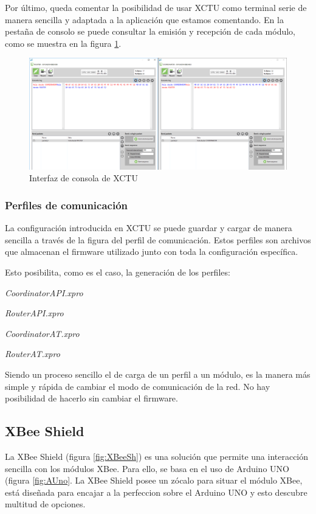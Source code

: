 Por último, queda comentar la posibilidad de usar XCTU como terminal serie de manera sencilla y adaptada a la aplicación que estamos comentando. En la pestaña de consolo se puede consultar la emisión y recepción de cada módulo, como se muestra en la figura \ref{fig:XCTUconsola}.

\begin{figure}[bth]
\centering
\includegraphics[width=1.1\textwidth, frame]{figuras/XCTUConsola.png}
\caption{Interfaz de consola de XCTU}
\label{fig:XCTUconsola}
\end{figure}


\subsubsection{Perfiles de comunicación}

La configuración introducida en XCTU se puede guardar y cargar de manera sencilla a través de la figura del perfil de comunicación. Estos perfiles son archivos que almacenan el firmware utilizado junto con toda la configuración específica.

Esto posibilita, como es el caso, la generación de los perfiles:

\textit{CoordinatorAPI.xpro}

\textit{RouterAPI.xpro}

\textit{CoordinatorAT.xpro}

\textit{RouterAT.xpro}

Siendo un proceso sencillo el de carga de un perfil a un módulo, es la manera más simple y rápida de cambiar el modo de comunicación de la red. No hay posibilidad de hacerlo sin cambiar el firmware.


\subsection{XBee Shield}

La XBee Shield (figura \ref{fig:XBeeSh}) es una solución que permite una interacción sencilla con los módulos XBee. Para ello, se basa en el uso de Arduino UNO (figura \ref{fig:AUno}. La XBee Shield posee un zócalo para situar el módulo XBee, está diseñada para encajar a la perfeccion sobre el Arduino UNO y esto descubre multitud de opciones.

